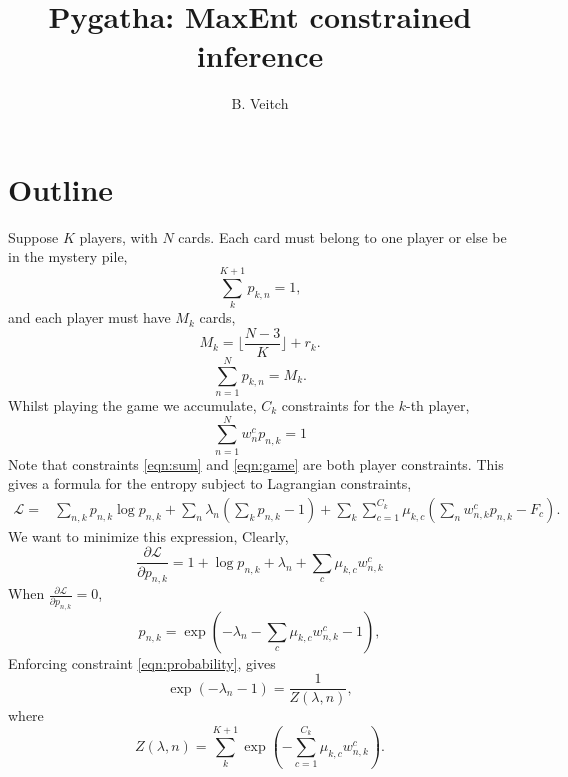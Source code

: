 \documentclass[12pt]{article}
\begin{document}
\title{Pygatha: MaxEnt constrained inference}
\author{B. Veitch}
\maketitle
\section{Outline}
Suppose $K$ players, with $N$ cards. Each card must belong to one player or else be in the mystery pile, 
\begin{equation}
\sum_{k}^{K+1}p_{k,n}=1,\label{eqn:probability}
\end{equation}
and each player must have $M_k$ cards,
\begin{equation}
M_k=\lfloor \frac{N-3}{K}\rfloor+r_{k}.
\end{equation}
\begin{equation}
\sum_{n=1}^{N}p_{k,n}=M_{k}. \label{eqn:sum}
\end{equation}
Whilst playing the game we accumulate, $C_k$ constraints for the $k$-th player,
\begin{equation}
\sum_{n=1}^{N} w^{c}_{n}p_{n,k}=1\label{eqn:game}
\end{equation}
Note that constraints \ref{eqn:sum} and \ref{eqn:game} are both player constraints.
This gives a formula for the entropy subject to Lagrangian constraints,
\begin{align}
\mathcal{L}=&\sum_{n,k} p_{n,k} \log{p_{n,k}}+\sum_{n}\lambda_{n}({\sum_{k} p_{n,k}-1})+\sum_{k}\sum_{c=1}^{C_k} \mu_{k,c}\left( \sum_{n} w^{c}_{n,k}p_{n,k}-F_{c}\right).
\end{align}
We want to minimize this expression, 
Clearly,
\begin{equation}
\frac{\partial \mathcal{L}}{\partial p_{n,k}}=1+\log{p_{n,k}}+\lambda_{n}+\sum_{c} \mu_{k,c}  w^{c}_{n,k}\label{eqn:gradL}
\end{equation}
When $\frac{\partial \mathcal{L}}{\partial p_{n,k}}=0$,
\begin{equation}
p_{n,k}=\exp{\left( -\lambda_{n}-\sum_{c} \mu_{k,c}  w^{c}_{n,k} -1\right)},
\end{equation}
Enforcing constraint \ref{eqn:probability}, gives
\begin{equation}
\exp(-\lambda_{n}-1)=\frac{1}{Z(\lambda, n)},
\end{equation}
where 
\begin{equation}
Z(\lambda, n)=
\sum_{k}^{K+1}\exp{\left(-\sum_{c=1}^{C_k} \mu_{k,c}  w^{c}_{n,k}\right)}.
\end{equation}
\end{document}
